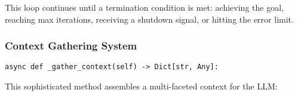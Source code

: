 \documentclass[12pt,a4paper]{article}
\begin{document}
This loop continues until a termination condition is met: achieving the goal, reaching max iterations, receiving a shutdown signal, or hitting the error limit.

\subsubsection*{Context Gathering System}
\begin{pageablecode}
\begin{verbatim}
async def _gather_context(self) -> Dict[str, Any]:
\end{verbatim}
\end{pageablecode}
This sophisticated method assembles a multi-faceted context for the LLM:
\end{document}
